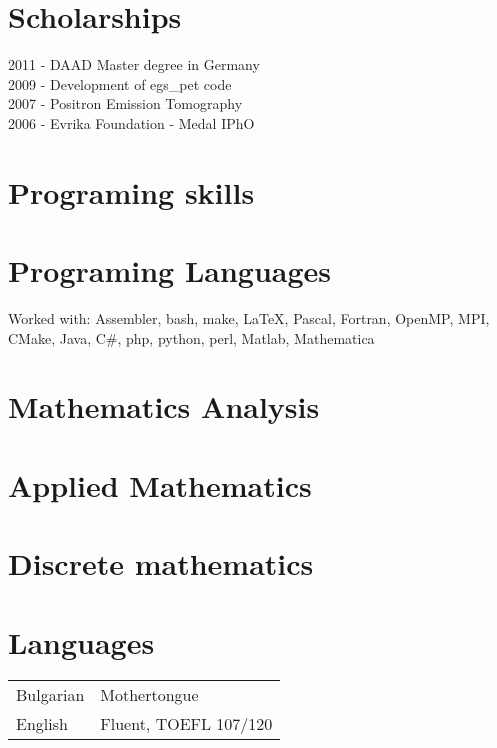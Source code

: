 \section*{Scholarships}
2011 - DAAD Master degree in Germany \\
2009 - Development of egs\_pet code \\
2007 - Positron Emission Tomography\\
2006 - Evrika Foundation - Medal IPhO\\
\section*{Programing skills}
\section*{Programing Languages}
Worked with: Assembler, bash, make, \LaTeX, Pascal, Fortran, OpenMP, MPI, CMake, Java, C\#, php, python, perl, Matlab, Mathematica
\section*{Mathematics Analysis}
\section*{Applied Mathematics}
\section*{Discrete mathematics}
\section*{Languages}
\begin{tabular}{ l l }
Bulgarian & Mothertongue \\
English   & Fluent, TOEFL 107/120\\
\end{tabular}
